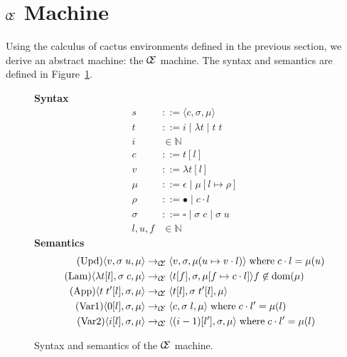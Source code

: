 \section{$\mathcal{\mathcal{C} \mskip -4mu \mathcal{E}}$ Machine} \label{sec:mach}

Using the calculus of cactus environments defined in the previous section, we
derive an abstract machine: the $\mathcal{\mathcal{C} \mskip -4mu \mathcal{E}}$ machine. The syntax
and semantics are defined in Figure~\ref{fig:CEM}. 

\begin{figure*}
\textbf{Syntax}
\begin{align*}
\tag{State} s &::= \langle c, \sigma, \mu \rangle \\
\tag{Term} t &::= i \; | \; \lambda t \; | \; t \; t  \\
\tag{Variable} i &\in \mathbb{N}  \\
\tag{Closure} c &::= t [l] \\
\tag{Value} v &::= \lambda t[l] \\
\tag{Heap} \mu &::= \epsilon \; | \; \mu [ l \mapsto \rho ] \\
\tag{Environment} \rho &::= \bullet \; | \; c \cdot l \\
\tag{Context} \sigma &::= \square \; | \; \sigma \; c \;  | \; \sigma \; u \\
\tag{Location} l,u,f &\in \mathbb{N}
\end{align*}
\textbf{Semantics}
\begin{align*}
\tag{Upd}
\langle v,  \sigma \; u , \mu \rangle 
  &\rightarrow_{\mathcal{\mathcal{C} \mskip -4mu \mathcal{E}}}
\langle v, \sigma, \mu(u \mapsto v \cdot l) \rangle  
\; \textnormal{where} \; c \cdot l = \mu(u) \\
\tag{Lam}
\langle \lambda t[l], \sigma \; c, \mu \rangle 
  &\rightarrow_{\mathcal{\mathcal{C} \mskip -4mu \mathcal{E}}}
\langle t[f], \sigma, \mu[f \mapsto c \cdot l]\rangle f \not \in \textnormal{dom}(\mu)  \\
\tag{App}
\langle t \; t'[l], \sigma, \mu \rangle
  &\rightarrow_{\mathcal{\mathcal{C} \mskip -4mu \mathcal{E}}}
\langle t[l], \sigma \; t'[l], \mu \rangle \\
\tag{Var1}
\langle 0[l], \sigma, \mu \rangle
  &\rightarrow_{\mathcal{\mathcal{C} \mskip -4mu \mathcal{E}}}
\langle c, \sigma \; l , \mu \rangle 
\; \textnormal{where} \; c \cdot l' = \mu(l)\\
\tag{Var2}
\langle i[l], \sigma, \mu \rangle
  &\rightarrow_{\mathcal{\mathcal{C} \mskip -4mu \mathcal{E}}}
\langle (i-1)[l'], \sigma, \mu \rangle
\; \textnormal{where} \; c \cdot l' = \mu(l)
\end{align*}
\caption{Syntax and semantics of the $\mathcal{\mathcal{C} \mskip -4mu \mathcal{E}}$ machine.}
\label{fig:CEM}
\end{figure*}

